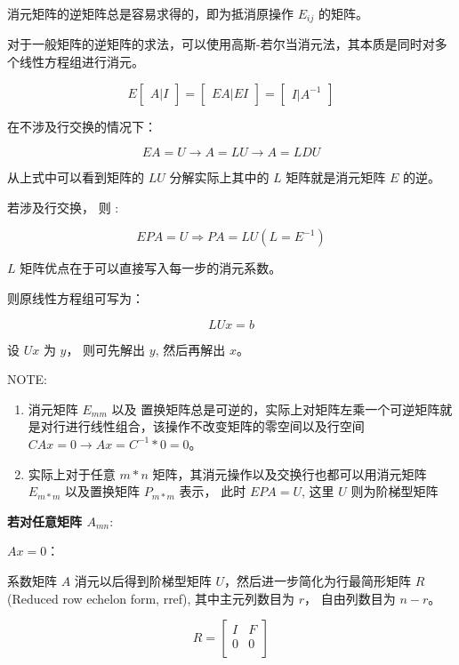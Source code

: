 \documentclass[
  letterpaper,
  DIV=11,
  numbers=noendperiod]{scrartcl}
\begin{document}
消元矩阵的逆矩阵总是容易求得的，即为抵消原操作 \(E_{ij}\) 的矩阵。

对于一般矩阵的逆矩阵的求法，可以使用高斯-若尔当消元法，其本质是同时对多个线性方程组进行消元。

\[
E \begin{bmatrix} A | I \end{bmatrix} =  \begin{bmatrix} EA | EI \end{bmatrix} = \begin{bmatrix} I | A^{-1} \end{bmatrix}
\]

在不涉及行交换的情况下：

\[
EA = U \rightarrow A = LU \rightarrow A = LDU
\]

从上式中可以看到矩阵的 \(LU\) 分解实际上其中的 \(L\) 矩阵就是消元矩阵
\(E\) 的逆。

若涉及行交换， 则 :

\[EPA = U \Rightarrow PA = LU (L = E^{-1})\]

\(L\) 矩阵优点在于可以直接写入每一步的消元系数。

则原线性方程组可写为：

\[
LUx = b
\]

设 \(Ux\) 为 \(y\)， 则可先解出 \(y\), 然后再解出 \(x\)。

NOTE:

\begin{enumerate}
\def\labelenumi{\arabic{enumi}.}
\item
  消元矩阵 \(E_{mm}\) 以及
  置换矩阵总是可逆的，实际上对矩阵左乘一个可逆矩阵就是对行进行线性组合，该操作不改变矩阵的零空间以及行空间
  \(CAx = 0 \rightarrow Ax = C^{-1}*0 = 0\)。
\item
  实际上对于任意 \(m * n\) 矩阵，其消元操作以及交换行也都可以用消元矩阵
  \(E_{m*m}\) 以及置换矩阵 \(P_{m*m}\) 表示， 此时 \(EPA = U\), 这里
  \(U\) 则为阶梯型矩阵
\end{enumerate}

\textbf{若对任意矩阵 \(A_{mn}\)}:

\(Ax = 0\)：

系数矩阵 \(A\) 消元以后得到阶梯型矩阵
\(U\)，然后进一步简化为行最简形矩阵 \(R\) (Reduced row echelon form,
rref), 其中主元列数目为 \(r\)， 自由列数目为 \(n - r\)。

\[
R = \begin{bmatrix} I & F \\
0 & 0 \\
\end{bmatrix}
\]
\end{document}
